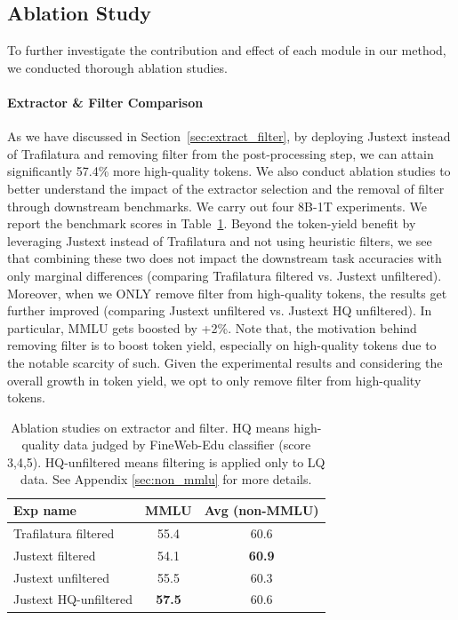\documentclass[11pt]{article}
\begin{document}
\subsection{Ablation Study} \label{sec:ablation}
To further investigate the contribution and effect of each module in our method, we conducted thorough ablation studies.

\paragraph{Extractor \& Filter Comparison}

As we have discussed in Section~\ref{sec:extract_filter}, by deploying Justext instead of Trafilatura and removing filter from the post-processing step, we can attain significantly 57.4\% more high-quality tokens. We also conduct ablation studies to better understand the impact of the extractor selection and the removal of filter through downstream benchmarks. We carry out four 8B-1T experiments. We report the benchmark scores in Table~\ref{table:extactor_filter_ablation}. Beyond the token-yield benefit by leveraging Justext instead of Trafilatura and not using heuristic filters, we see that combining these two does not impact the downstream task accuracies with only marginal differences (comparing Trafilatura filtered vs. Justext unfiltered). Moreover, when we ONLY remove filter from high-quality tokens, the results get further improved (comparing Justext unfiltered vs. Justext HQ unfiltered). In particular, MMLU gets boosted by +2\%. Note that, the motivation behind removing filter is to boost token yield, especially on high-quality tokens due to the notable scarcity of such. Given the experimental results and considering the overall growth in token yield, we opt to only remove filter from high-quality tokens.

\begin{table}[!hbt] \small \centering
\begin{tabularx}{\linewidth}{Xcc}
\toprule
\textbf{Exp name}     & \textbf{MMLU} & \textbf{Avg (non-MMLU)} \\ \midrule
Trafilatura filtered  & 55.4              & 60.6                   \\ 
Justext filtered      & 54.1              & \textbf{60.9}          \\ 
Justext unfiltered    & 55.5              & 60.3                   \\ 
Justext HQ-unfiltered & \textbf{57.5}     & 60.6                   \\ \bottomrule
\end{tabularx}
\caption{Ablation studies on extractor and filter. HQ means high-quality data judged by FineWeb-Edu classifier (score 3,4,5). HQ-unfiltered means filtering is applied only to LQ data. See Appendix \ref{sec:non_mmlu} for more details.}
\label{table:extactor_filter_ablation}
\end{table}
\end{document}
